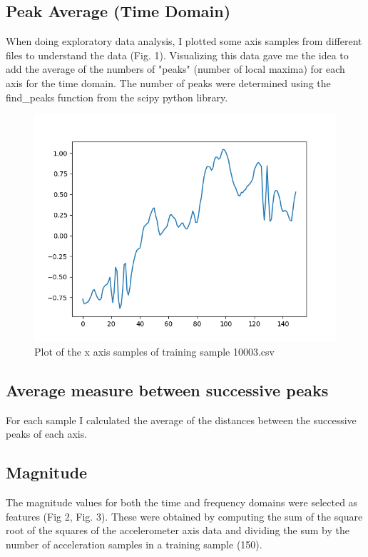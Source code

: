 \documentclass{article}
\begin{document}
\subsection{Peak Average (Time Domain)}
When doing exploratory data analysis, I plotted some axis samples from different files to understand the data (Fig. 1). Visualizing this data gave me the idea to add the average of the numbers of "peaks" (number of local maxima) for each axis for the time domain. The number of peaks were determined using the find\_peaks function from the scipy python library\cite{findpeaks}.
\begin{figure}[h]
	\centering
	\includegraphics[scale=0.5]{10003csv_axisxpeaks.png}
	\caption{Plot of the x axis samples of training sample 10003.csv}
\end{figure}

\subsection{Average measure between successive peaks}
For each sample I calculated the average of the distances  between the successive peaks of each axis.

\subsection{Magnitude}
The magnitude values for both the time and frequency domains were selected as features (Fig 2, Fig. 3). These were obtained by computing the sum of the square root of the squares of the accelerometer axis data and dividing the sum by the number of acceleration samples in a training sample (150).  
\end{document}
